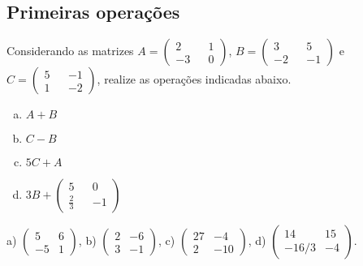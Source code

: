 \documentclass[main.tex]{subfiles}
\begin{document}
\subsection*{Primeiras operações}
\begin{questao}
Considerando as matrizes $A=\begin{pmatrix} 2 && 1 \\ -3 && 0 \end{pmatrix}$, $B=\begin{pmatrix} 3 && 5 \\ -2 && -1 \end{pmatrix}$ e $C=\begin{pmatrix} 5 && -1 \\ 1 && -2 \end{pmatrix}$, realize as operações indicadas abaixo.
\begin{enumerate}[a)]
\item $A+B$
\item $C-B$
\item $5C+A$
\item $3B+\begin{pmatrix} 5 && 0 \\ \frac{2}{3} && -1 \end{pmatrix}$
\end{enumerate}

\end{questao}

\begin{gabarito}
	\begin{gabaritoQuestao}
		a) $\begin{pmatrix} 5 & 6 \\ -5 & 1\end{pmatrix}$, b) $\begin{pmatrix} 2 & -6 \\ 3 & -1\end{pmatrix}$, c) $\begin{pmatrix} 27 & -4 \\ 2 & -10\end{pmatrix}$, d) $\begin{pmatrix} 14 & 15 \\ -16/3 & -4\end{pmatrix}$.
	\end{gabaritoQuestao}
\end{gabarito}
\end{document}
